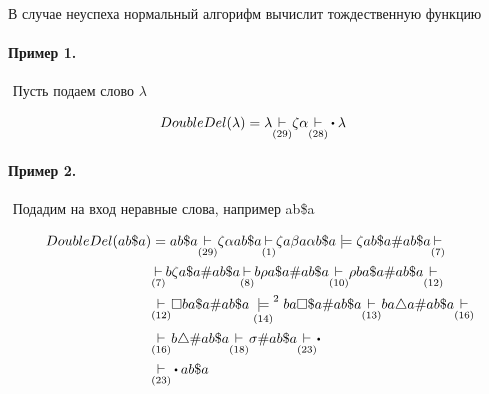 В случае неуспеха нормальный алгорифм вычислит тождественную функцию

\paragraph*{Пример 1.} ${}$\newline
Пусть подаем слово $\lambda$

\begin{align*}
     &DoubleDel(\lambda) = \lambda \underset{(29)}{\step}
     \zeta\alpha \underset{(28)}{\step}\bigcdot \lambda
\end{align*}


\paragraph*{Пример 2.} ${}$ \newline
Подадим на вход неравные слова, например ab\$a

\begin{align*}
    DoubleDel(ab\$a) &= ab\$a \underset{(29)}{\step} \zeta\alpha ab\$a \underset{(1)}{\step}
    \zeta a\beta a\alpha b\$a \models \zeta ab\$a\#ab\$a \underset{(7)}{\step}\\
                     &\underset{(7)}{\step} b\zeta a\$a\#ab\$a \underset{(8)}{\step}
                     b\rho a\$a\#ab\$a \underset{(10)}{\step} \rho ba\$a\#ab\$a
                     \underset{(12)}{\step}\\
                     &\underset{(12)}{\step} \square ba\$a\#ab\$a
                     \underset{(14)}{\models}^{2} ba\square\$a\#ab\$a
                     \underset{(13)}{\step} ba\triangle a\#ab\$a 
                     \underset{(16)}{\step}\\
                     &\underset{(16)}{\step} b\triangle\#ab\$a
                     \underset{(18)}{\step} \sigma\#ab\$a
                     \underset{(23)}{\step} \bigcdot\\
                     &\underset{(23)}{\step} \bigcdot ab\$a
\end{align*}



